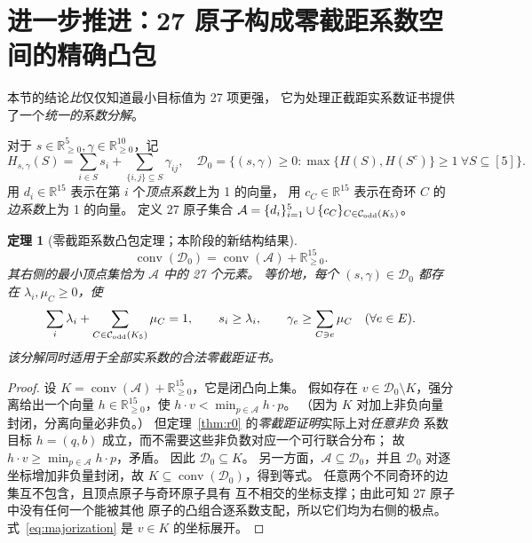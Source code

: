 \documentclass[11pt,a4paper]{ctexart}
\newtheorem{theorem}{定理}[section]
\theoremstyle{remark}
\newcommand{\V}{[5]}
\newcommand{\CE}{\mathcal C_{\rm odd}(K_5)}
\newcommand{\N}{\mathbb R_{\ge0}}
\begin{document}
\section{进一步推进：27 原子构成零截距系数空间的精确凸包}
本节的结论\emph{比}仅仅知道最小目标值为 27 项更强，
它为处理正截距实系数证书提供了一个\emph{统一的系数分解}。

对于 $s\in\N^5,\gamma\in\N^{10}$，记
\[
H_{s,\gamma}(S)=\sum_{i\in S}s_i+\sum_{\{i,j\}\subseteq S}\gamma_{ij},
\quad
\mathcal D_0=\bigl\{(s,\gamma)\ge0:
\max\{H(S),H(S^c)\}\ge1\ \forall S\subseteq\V\bigr\}.
\]
用 $d_i\in\mathbb R^{15}$ 表示在第 $i$ 个\emph{顶点系数}上为 1 的向量，
用 $c_C\in\mathbb R^{15}$ 表示在奇环 $C$ 的\emph{边系数}上为 1 的向量。
定义 27 原子集合 $\mathcal A=\{d_i\}_{i=1}^5\cup\{c_C\}_{C\in\CE}$。

\begin{theorem}[零截距系数凸包定理；本阶段的新结构结果]\label{thm:hull}
\begin{equation}\label{eq:hull}
\boxed{
\operatorname{conv}(\mathcal D_0)
=\operatorname{conv}(\mathcal A)+\N^{15}.
}
\end{equation}
其右侧的最小顶点集恰为 $\mathcal A$ 中的 27 个元素。
等价地，\emph{每个} $(s,\gamma)\in\mathcal D_0$ 都存在
$\lambda_i,\mu_C\ge0$，使
\begin{equation}\label{eq:majorization}
\sum_i\lambda_i+\sum_{C\in\CE}\mu_C=1,
\qquad s_i\ge\lambda_i,
\qquad
\gamma_e\ge\sum_{C\ni e}\mu_C\quad(\forall e\in E).
\end{equation}
该分解同时适用于\emph{全部实系数}的合法零截距证书。
\end{theorem}
\begin{proof}
设 $K=\operatorname{conv}(\mathcal A)+\N^{15}$，它是闭凸向上集。
假如存在 $v\in\mathcal D_0\setminus K$，强分离给出一个向量
$h\in\N^{15}$，使
$h\cdot v<\min_{p\in\mathcal A}h\cdot p$。
（因为 $K$ 对加上非负向量封闭，分离向量必非负。）
但定理~\ref{thm:r0} 的\emph{零截距证明}实际上对\emph{任意非负}
系数目标 $h=(q,b)$ 成立，而不需要这些非负数对应一个可行联合分布；
故 $h\cdot v\ge\min_{p\in\mathcal A}h\cdot p$，矛盾。
因此 $\mathcal D_0\subseteq K$。
另一方面，$\mathcal A\subseteq\mathcal D_0$，并且
$\mathcal D_0$ 对逐坐标增加非负量封闭，故
$K\subseteq\operatorname{conv}(\mathcal D_0)$，得到等式。
任意两个不同奇环的边集互不包含，且顶点原子与奇环原子具有
互不相交的坐标支撑；由此可知 27 原子中没有任何一个能被其他
原子的凸组合逐系数支配，所以它们均为右侧的极点。
式~\eqref{eq:majorization} 是 $v\in K$ 的坐标展开。
\end{proof}
\end{document}
